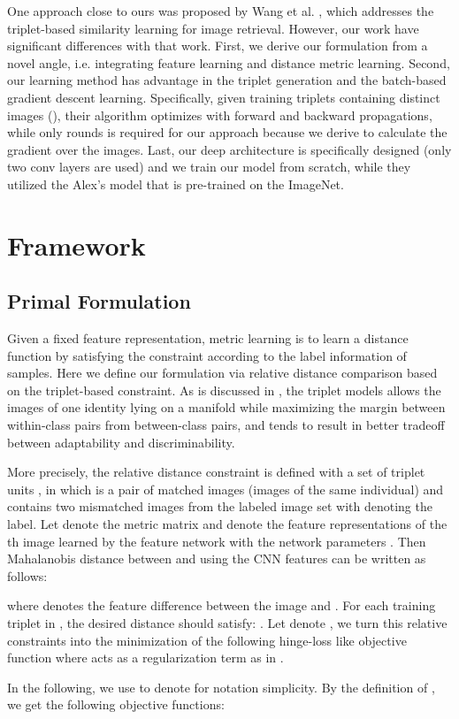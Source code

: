 \documentclass[letterpaper]{article}
\begin{document}
One approach close to ours was proposed by Wang et al. \cite{wang2014learning}, which addresses the triplet-based similarity learning for image retrieval. However, our work have significant differences with that work. First, we derive our formulation from a novel angle, i.e. integrating feature learning and distance metric learning. Second, our learning method has advantage in the triplet generation and the batch-based gradient descent learning. Specifically, given  training triplets containing  distinct images (), their algorithm optimizes with  forward and backward propagations, while only  rounds is required for our approach because we derive to calculate the gradient over the images. Last, our deep architecture is specifically designed (only two conv layers are used) and we train our model from scratch, while they utilized the Alex's model \cite{krizhevsky2012imagenet} that is pre-trained on the ImageNet.



\section{Framework}
\subsection{Primal Formulation}

Given a fixed feature representation, metric learning is to learn a distance function by satisfying the constraint according to the label information of samples. Here we define our formulation via relative distance comparison based on the triplet-based constraint. As is discussed in \cite{ding2015deep}, the triplet models allows the images of one identity lying on a manifold while maximizing the margin between within-class pairs from between-class pairs, and tends to result in better tradeoff between adaptability and discriminability.

More precisely, the relative distance constraint is defined with a set of  triplet units , in which  is a pair of matched images (images of the same individual) and  contains two mismatched images from the labeled image set  with  denoting the label. Let  denote the metric matrix and  denote the feature representations of the th image learned by the feature network with the network parameters . Then Mahalanobis distance between  and  using the CNN features can be written as follows:

where  denotes the feature difference between the image  and . For each training triplet  in , the desired distance should satisfy: . Let  denote , we turn this relative constraints into the minimization of the following hinge-loss like objective function where  acts as a regularization term as in \cite{shen2012positive}.
\begin{small}

\end{small}
In the following, we use  to denote  for notation simplicity. By the definition of , we get the following objective functions:
\begin{small}

\end{small}
\end{document}
